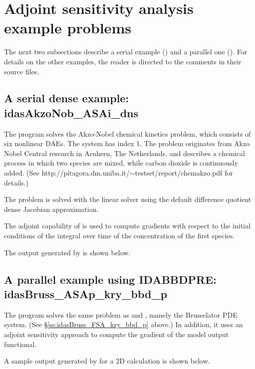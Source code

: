 \section{Adjoint sensitivity analysis example problems}\label{s:adj_examples}

The next two subsections describe a serial example () and
a parallel one ().
For details on the other examples, the reader is directed to the comments in their
source files.

\subsection{A serial dense example: idasAkzoNob\_ASAi\_dns}\label{ss:idasAkzoNob_ASAi_dns}

The  program solves the Akzo-Nobel chemical kinetics problem,
which consists of six nonlinear DAEs.  The system has index 1. 
The problem originates from Akzo Nobel Central research in Arnhern,
The Netherlands, and describes a chemical process in which two
species are mixed, while carbon dioxide is continuously added.
(See http://pitagora.dm.uniba.it/$\sim$testset/report/chemakzo.pdf for
details.)

The problem is solved with the {\idadense} linear solver using the
default difference quotient dense Jacobian approximation.

The adjoint capability of {\idas} is used to compute gradients with
respect to the initial conditions of the integral over time of the 
concentration of the first species.

The output generated by  is shown below.



\newpage
\subsection{A parallel example using IDABBDPRE: idasBruss\_ASAp\_kry\_bbd\_p}
\label{ss:idasBruss_ASAp_kry_bbd_p}

The  program solves the same problem as
 and , namely the
Brusselator PDE system.  (See \S\ref{ss:idasBruss_FSA_kry_bbd_p} above.)
In addition, it uses an adjoint sensitivity approach to compute the
gradient of the model output functional.

A sample output generated by  for a
2D calculation is shown below.


